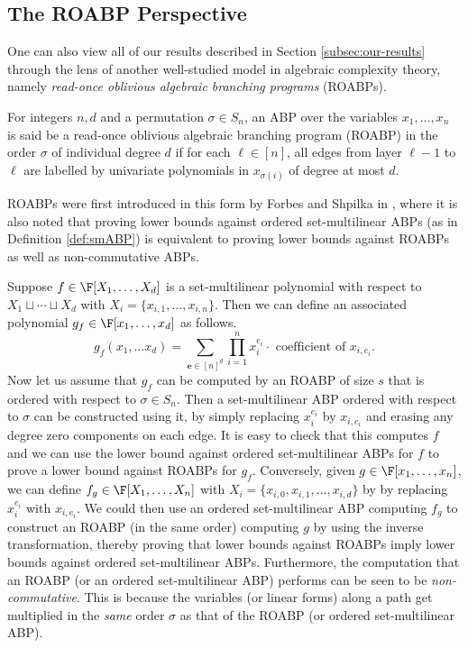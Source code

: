 \documentclass{article}
\begin{document}
\subsection{The ROABP Perspective}\label{subsec:roabps}

One can also view all of our results described in Section \ref{subsec:our-results} through the lens of another well-studied model in algebraic complexity theory, namely \emph{read-once oblivious algebraic branching programs} (ROABPs). 

\begin{definition}[ROABP]\label{def:ROABP}
For integers $n,d$ and a permutation $\sigma \in S_n$, an ABP over the variables $x_1,\ldots,x_n$ is said be a read-once oblivious algebraic branching program (ROABP) in the order $\sigma$ of individual degree $d$ if for each $\ell\in [n]$, all edges from layer $\ell - 1$ to $\ell$ are labelled by univariate polynomials in $x_{\sigma(i)}$ of degree at most $d$.
\end{definition}

ROABPs were first introduced in this form by Forbes and Shpilka in \cite{ForbesS13}, where it is also noted that proving lower bounds against ordered set-multilinear ABPs (as in Definition \ref{def:smABP}) is equivalent to proving lower bounds against ROABPs as well as non-commutative ABPs.

Suppose $f \in \F[X_1, \ldots, X_d]$ is a set-multilinear polynomial with respect to $X_1 \sqcup \cdots \sqcup X_d$ with $X_i = \{x_{i,1}, \ldots, x_{i,n}\}$.
Then we can define an associated polynomial $g_f \in \F[x_1, \ldots, x_d]$ as follows. 
\[
    g_f(x_1, \ldots x_d) = \sum_{\mathbf{e} \in [n]^d} \prod_{i=1}^{n} x_i^{e_i} \cdot \text{ coefficient of } x_{i,e_i}.
\]
Now let us assume that $g_f$ can be computed by an ROABP of size $s$ that is ordered with respect to $\sigma \in S_n$.
Then a set-multilinear ABP ordered with respect to $\sigma$ can be constructed using it, by simply replacing $x_i^{e_i}$ by $x_{i,e_i}$ and erasing any degree zero components on each edge.
It is easy to check that this computes $f$ and we can use the lower bound against ordered set-multilinear ABPs for $f$ to prove a lower bound against ROABPs for $g_f$.
Conversely, given $g \in \F[x_1, \ldots, x_n]$, we can define $f_g \in \F[X_1, \ldots, X_n]$ with $X_i = \{x_{i,0}, x_{i,1}, \ldots, x_{i,d}\}$ by by replacing $x_i^{e_i}$ with $x_{i,e_i}$.
We could then use an ordered set-multilinear ABP computing $f_g$ to construct an ROABP (in the same order) computing $g$ by using the inverse transformation, thereby proving that lower bounds against ROABPs imply lower bounds against ordered set-multilinear ABPs.
Furthermore, the computation that an ROABP (or an ordered set-multilinear ABP) performs can be seen to be \emph{non-commutative}. 
This is because the variables (or linear forms) along a path get multiplied in the \emph{same} order $\sigma$ as that of the ROABP (or ordered set-multilinear ABP).
\end{document}
